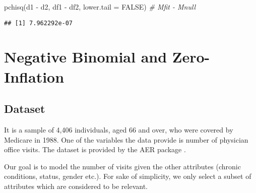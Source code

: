\documentclass[
  oneside]{book}
\newenvironment{Shaded}{\begin{snugshade}}{\end{snugshade}}
\newcommand{\AttributeTok}[1]{\textcolor[rgb]{0.77,0.63,0.00}{#1}}
\newcommand{\CommentTok}[1]{\textcolor[rgb]{0.56,0.35,0.01}{\textit{#1}}}
\newcommand{\ConstantTok}[1]{\textcolor[rgb]{0.00,0.00,0.00}{#1}}
\newcommand{\FunctionTok}[1]{\textcolor[rgb]{0.00,0.00,0.00}{#1}}
\newcommand{\NormalTok}[1]{#1}
\newcommand{\SpecialCharTok}[1]{\textcolor[rgb]{0.00,0.00,0.00}{#1}}
\begin{document}
\begin{Shaded}
\begin{Highlighting}[]
\FunctionTok{pchisq}\NormalTok{(d1 }\SpecialCharTok{{-}}\NormalTok{ d2, df1 }\SpecialCharTok{{-}}\NormalTok{ df2, }\AttributeTok{lower.tail =} \ConstantTok{FALSE}\NormalTok{) }\CommentTok{\# Mfit {-} Mnull}
\end{Highlighting}
\end{Shaded}

\begin{verbatim}
## [1] 7.962292e-07
\end{verbatim}

\hypertarget{negative-binomial-and-zero-inflation}{%
\chapter{Negative Binomial and Zero-Inflation}\label{negative-binomial-and-zero-inflation}}

\hypertarget{dataset}{%
\section{Dataset}\label{dataset}}

It is a sample of 4,406 individuals, aged 66 and over, who were covered by Medicare
in 1988. One of the variables the data provide is number of physician office visits.
The dataset is provided by the AER package \citep{aer}.

Our goal is to model the number of visits given the other attributes (chronic conditions,
status, gender etc.). For sake of simplicity, we only select a subset of attributes which
are considered to be relevant.
\end{document}
